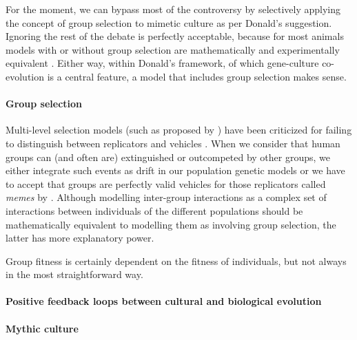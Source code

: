 \documentclass{article}
\begin{document}
For the moment, we can bypass most of the controversy by selectively applying the
concept of group selection to mimetic culture as per Donald's suggestion.
Ignoring the rest of the debate is perfectly acceptable, because for most
animals models with or without group selection are mathematically and
experimentally equivalent \citep{dennett2002}. Either way, within Donald's
framework, of which gene-culture co-evolution is a central feature, a model
that includes group selection makes sense.

\paragraph{Group selection}

Multi-level selection models (such as proposed by \citealp{sober1999}) have
been criticized for failing to distinguish between replicators and vehicles
\citep{dennett2002}.  When we consider that human groups can (and often are)
extinguished or outcompeted by other groups, we either integrate such events as
drift in our population genetic models or we have to accept that groups are
perfectly valid vehicles for those replicators called \emph{memes} by
\citet{dawkins1976}.  Although modelling inter-group interactions as a complex
set of interactions between individuals of the different populations should be
mathematically equivalent to modelling them as involving group selection, the
latter has more explanatory power.

Group fitness is certainly dependent on the fitness of individuals, but not
always in the most straightforward way.

\paragraph{Positive feedback loops between cultural and biological evolution}


\paragraph{Mythic culture}



\end{document}
